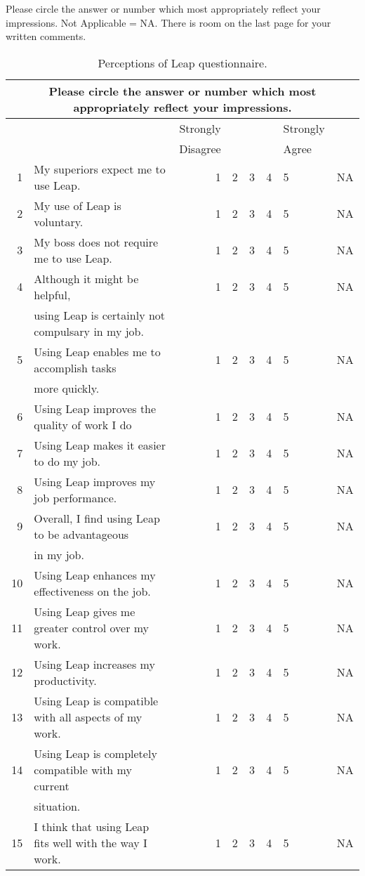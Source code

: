 \documentclass[11pt,times,dissertation,proposal]{uhthesis2e}
\begin{document}
Please circle the answer or number which most appropriately reflect your
impressions.  Not Applicable = NA.  There is room on the last page for your
written comments.\\
\begin{table}[htbp]
  \caption{Perceptions of Leap questionnaire.}  
  \begin{tabular}{rlrccclc}\\
    \multicolumn{8}{c}{Please circle the answer or number which most
    appropriately reflect your impressions.} \\
    \hline
    \hline
    &&Strongly&&&&Strongly&\\ 
    &&Disagree&&&&Agree&\\ \hline
    1&My superiors expect me to use Leap.&1&2&3&4&5&NA\\ \hline
    2&My use of Leap is voluntary.&1&2&3&4&5&NA\\ \hline
    3&My boss does not require me to use Leap.&1&2&3&4&5&NA\\ \hline
    4&Although it might be helpful, &1&2&3&4&5&NA\\
    &using Leap is certainly not compulsary in my job.\\ \hline \hline
    5&Using Leap enables me to accomplish tasks&1&2&3&4&5&NA\\
    &more quickly.\\ \hline
    6&Using Leap improves the quality of work I do&1&2&3&4&5&NA\\ \hline
    7&Using Leap makes it easier to do my job.&1&2&3&4&5&NA\\ \hline
    8&Using Leap improves my job performance.&1&2&3&4&5&NA\\ \hline
    9&Overall, I find using Leap to be advantageous&1&2&3&4&5&NA\\
    &in my job.\\ \hline
    10&Using Leap enhances my effectiveness on the job.&1&2&3&4&5&NA\\ \hline
    11&Using Leap gives me greater control over my work.&1&2&3&4&5&NA\\ \hline
    12&Using Leap increases my productivity.&1&2&3&4&5&NA\\ \hline \hline
    13&Using Leap is compatible with all aspects of my work.&1&2&3&4&5&NA\\ \hline
    14&Using Leap is completely compatible with my current &1&2&3&4&5&NA\\
    &situation.\\ \hline
    15&I think that using Leap fits well with the way I work.&1&2&3&4&5&NA\\

\end{tabular}
\end{table}
\end{document}
